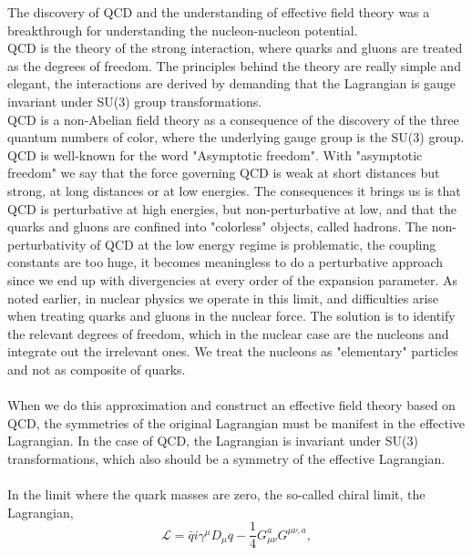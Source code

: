 The discovery of QCD and the understanding of effective field theory was a
breakthrough for understanding the nucleon-nucleon potential.\\ QCD is the
theory of the strong interaction, where quarks and gluons are treated as
the degrees of freedom.  The principles behind the theory are really simple and
elegant, the interactions are derived by demanding that the Lagrangian is gauge
invariant under SU(3) group transformations.\\ 
QCD is a non-Abelian field theory as a
consequence of the discovery of the three quantum numbers of color, where the
underlying gauge group is the SU(3) group. QCD is well-known for the word "Asymptotic
freedom". With "asymptotic freedom" we say that the 
force governing QCD is weak at short distances but strong, at long distances or
at low energies. The consequences it brings us is that QCD is perturbative at high energies, but non-perturbative at low, and that the quarks and gluons 
are confined into "colorless" objects, called hadrons. 
The non-perturbativity of QCD at the low energy regime is 
problematic, the coupling constants are too huge, it becomes meaningless to do a 
perturbative approach since we end up with divergencies at every order of the
expansion parameter. 
As noted earlier, in nuclear physics we operate in this limit, and difficulties arise when treating quarks and gluons
in the nuclear force.  
The solution is to identify the relevant degrees of 
freedom, which in the nuclear case are the nucleons and integrate out the irrelevant ones. 
We treat the nucleons as
"elementary" particles and not as composite of quarks.\\%
\\
When we do this approximation and construct an effective field theory based on QCD, the symmetries 
of the original Lagrangian must be manifest in the effective Lagrangian. 
In the case of QCD, the Lagrangian is invariant under SU(3) transformations, which also should be a symmetry
of the effective Lagrangian.\\
\\
In the limit where the quark masses are zero, the so-called chiral limit, the 
Lagrangian,
\begin{equation*}
		\mathcal L = \bar q i\gamma^\mu D_\mu q-\frac{1}{4}G^a_{\mu\nu}G^{\mu\nu,a},
\end{equation*}

